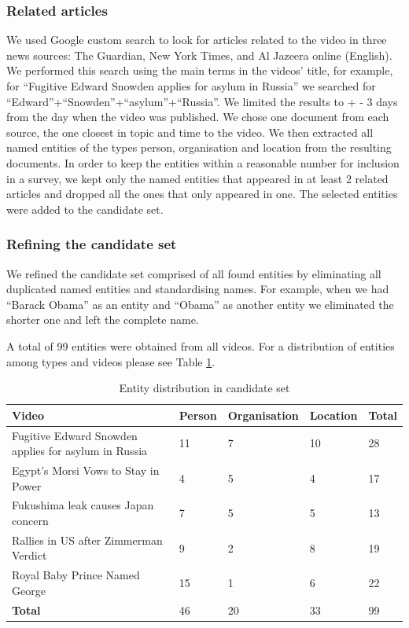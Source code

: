 \documentclass{llncs}
\begin{document}
\subsubsection{Related articles}
We used Google custom search to look for articles related to the video in three news sources: The Guardian, New York Times, and Al Jazeera online (English). We performed this search using the main terms in the videos’ title, for example, for ``Fugitive Edward Snowden applies for asylum in Russia'' we searched for  ``Edward''+``Snowden''+``asylum''+``Russia''. We limited the results to + - 3 days from the day when the video was published. We chose one document from each source, the one closest in topic and time to the video. We then extracted all named entities of the types person, organisation and location from the resulting documents. In order to keep the entities within a reasonable number for inclusion in a survey, we kept only the named entities that appeared in at least 2 related articles and dropped all the ones that only appeared in one.  The selected entities were added to the candidate set. 

\subsubsection{Refining the candidate set}
We refined the candidate set  comprised of all found entities by eliminating all duplicated named entities and standardising names. For example, when we had ``Barack Obama'' as an entity and ``Obama'' as another entity we eliminated the shorter one and left the complete name. 
	
A total of 99 entities were obtained from all videos. For a distribution of entities among types and videos please see Table \ref{table:entitydistribution}.

\begin{table}[h]
\begin{tabular}{| p{6cm} | l| l| l| l|}
  \hline
  \textbf{Video} & \textbf{Person} & \textbf{Organisation} &\textbf{Location} & \textbf{Total} \\
    \hline
  Fugitive Edward Snowden applies for asylum in Russia & 11 & 7 & 10 & 28 \\
    \hline
 Egypt's Morsi Vows to Stay in Power & 4 & 5 & 4 & 17 \\
    \hline
 Fukushima leak causes Japan concern & 7 & 5 & 5 & 13\\
    \hline
 Rallies in US after Zimmerman Verdict & 9 & 2 & 8 & 19 \\
    \hline
 Royal Baby Prince Named George & 15 & 1 & 6 & 22 \\
    \hline
    \textbf{Total}  & 46 & 20 & 33 & 99\\
  \hline
\end{tabular}
\caption[Table caption text]{Entity distribution in candidate set}
\label{table:entitydistribution}
\end{table}
\end{document}
